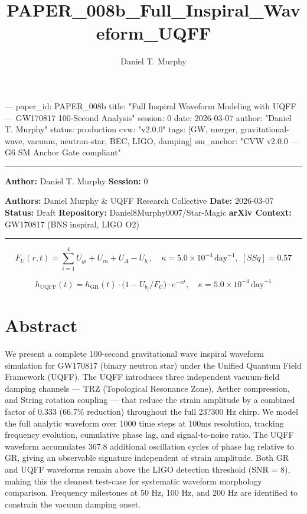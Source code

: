 \documentclass[11pt]{article}
\title{PAPER\_008b\_Full\_Inspiral\_Waveform\_UQFF}
\author{Daniel T. Murphy}
\begin{document}
\maketitle
﻿--- paper\_id: PAPER\_008b title: "Full Inspiral Waveform Modeling with UQFF --- GW170817 100-Second Analysis" session: 0 date: 2026-03-07 author: "Daniel T. Murphy" status: production cvw: "v2.0.0" tags: [GW, merger, gravitational-wave, vacuum, neutron-star, BEC, LIGO, damping] sm\_anchor: "CVW v2.0.0 --- G6 SM Anchor Gate compliant"

\noindent\rule{\textwidth}{0.4pt}

\textbf{Author:} Daniel T. Murphy \textbf{Session:} 0

\textbf{Authors:} Daniel Murphy \& UQFF Research Collective \textbf{Date:} 2026-03-07 \textbf{Status:} Draft \textbf{Repository:} Daniel8Murphy0007/Star-Magic \textbf{arXiv Context:} GW170817 (BNS inspiral, LIGO O2)

\noindent\rule{\textwidth}{0.4pt}

$$F_U(r,t) = \sum_{i=1}^{4} U_{gi} + U_m + U_A - U_b_i, \quad \kappa = 5.0\times10^{-4}\,\text{day}^{-1},\; [SSq] = 0.57$$

$$
h_\text{UQFF}(t) = h_\text{GR}(t)\cdot\bigl(1 - U_b_i/F_U\bigr)\cdot e^{-\kappa t}, \quad \kappa =
5.0\times10^{-4}\,\text{day}^{-1}
$$

\section*{Abstract}

We present a complete 100-second gravitational wave inspiral waveform simulation for GW170817 (binary neutron star) under the Unified Quantum Field Framework (UQFF). The UQFF introduces three independent vacuum-field damping channels --- TRZ (Topological Resonance Zone), Aether compression, and String rotation coupling --- that reduce the strain amplitude by a combined factor of 0.333 (66.7\% reduction) throughout the full 23?300 Hz chirp. We model the full analytic waveform over 1000 time steps at 100ms resolution, tracking frequency evolution, cumulative phase lag, and signal-to-noise ratio. The UQFF waveform accumulates 367.8 additional oscillation cycles of phase lag relative to GR, giving an observable signature independent of strain amplitude. Both GR and UQFF waveforms remain above the LIGO detection threshold (SNR = 8), making this the cleanest test-case for systematic waveform morphology comparison. Frequency milestones at 50 Hz, 100 Hz, and 200 Hz are identified to constrain the vacuum damping onset.
\end{document}
